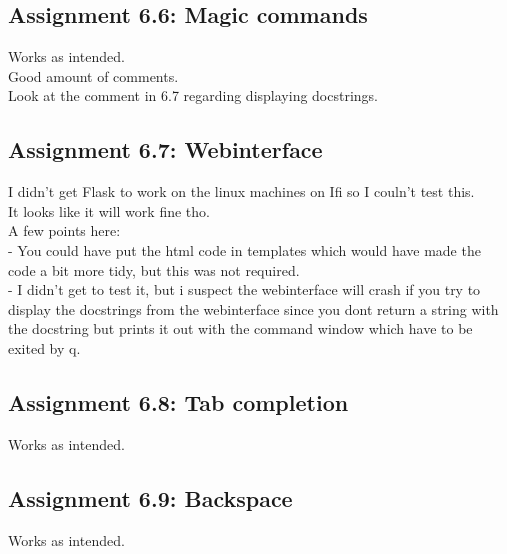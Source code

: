 \documentclass[a4paper]{article}
\begin{document}
\subsection*{Assignment 6.6: Magic commands}
Works as intended.\\
Good amount of comments.\\
Look at the comment in 6.7 regarding displaying docstrings.

\subsection*{Assignment 6.7: Webinterface}
I didn't get Flask to work on the linux machines on Ifi so I couln't test this.\\
It looks like it will work fine tho.\\
A few points here:\\
- You could have put the html code in templates which would have made the code a bit more tidy, but this was not required.\\
- I didn't get to test it, but i suspect the webinterface will crash if you try to display the docstrings
  from the webinterface since you dont return a string with the docstring but prints it out with the command
  window which have to be exited by q.


\subsection*{Assignment 6.8: Tab completion}
Works as intended.


\subsection*{Assignment 6.9: Backspace}
Works as intended.




\end{document}

